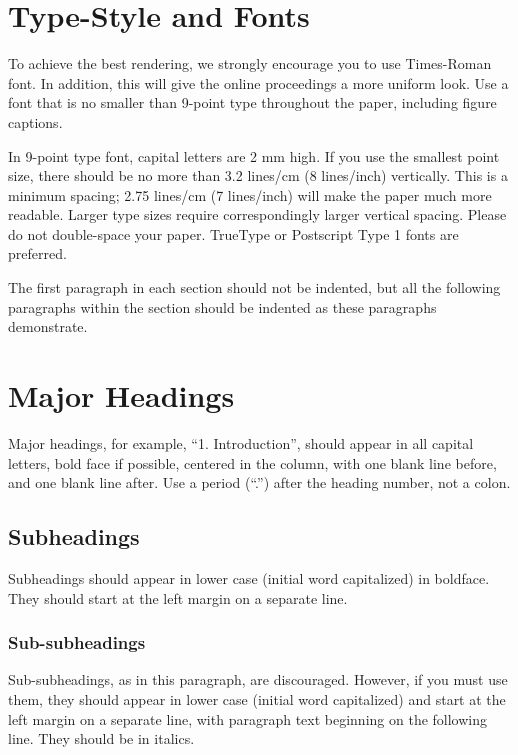 \documentclass{article}
\begin{document}
\section{Type-Style and Fonts}
\label{sec:typestyle}

To achieve the best rendering, we strongly encourage you to use Times-Roman font.  In addition, this will give the online proceedings a more uniform look. Use a font that is no smaller than 9-point type throughout the paper, including figure captions.

In 9-point type font, capital letters are 2 mm high.  If you use the smallest point size, there should be no more than 3.2 lines/cm (8 lines/inch)
vertically.  This is a minimum spacing; 2.75 lines/cm (7 lines/inch) will make the paper much more readable.  Larger type sizes require correspondingly larger vertical spacing.  Please do not double-space your paper.  TrueType or Postscript Type 1 fonts are preferred.

The first paragraph in each section should not be indented, but all the following paragraphs within the section should be indented as these paragraphs
demonstrate.

\section{Major Headings}
\label{sec:majhead}

Major headings, for example, ``1. Introduction'', should appear in all capital letters, bold face if possible, centered in the column, with one blank line before, and one blank line after. Use a period (``.'') after the heading number, not a colon.

\subsection{Subheadings}
\label{ssec:subhead}

Subheadings should appear in lower case (initial word capitalized) in boldface.  They should start at the left margin on a separate line.

\subsubsection{Sub-subheadings}
\label{sssec:subsubhead}

Sub-subheadings, as in this paragraph, are discouraged. However, if you must use them, they should appear in lower case (initial word capitalized) and start at the left margin on a separate line, with paragraph text beginning on the following line.  They should be in italics.
\end{document}
